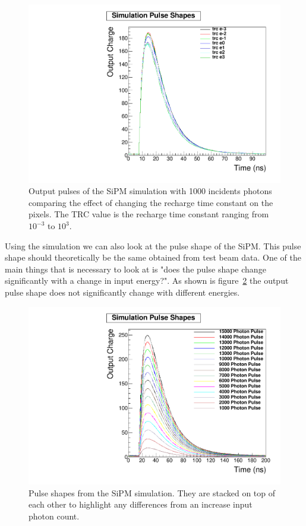 \begin{figure}
\centering
\includegraphics[width=0.8\linewidth]{Figures/trc.pdf}
\caption{Output pulses of the SiPM simulation with 1000 incidents photons comparing the effect of changing the recharge time constant on the pixels. The TRC value is the recharge time constant ranging from $10^{-3}$ to $10^3$.}
\label{fig:trc}
\end{figure}

Using the simulation we can also look at the pulse shape of the SiPM. This pulse shape should theoretically be the same obtained from test beam data. One of the main things that is necessary to look at is "does the pulse shape change significantly with a change in input energy?". As shown is figure~\ref{fig:SimPul} the output pulse shape does not significantly change with different energies.

\begin{figure}
\centering
\includegraphics[width=0.8\linewidth]{Figures/SimPul.pdf}
\caption{Pulse shapes from the SiPM simulation. They are stacked on top of each other to highlight any differences from an increase input photon count.}
\label{fig:SimPul}
\end{figure}

